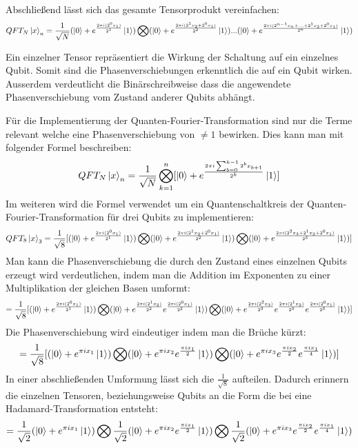 Abschließend lässt sich das gesamte Tensorprodukt vereinfachen:
\[QFT_{N}\ket{x}_{n} = \frac{1}{\sqrt{N}}(\ket{0} + { e^{\frac{2 \pi i (2^0x_1)}{2^1}}}\ket{1}) \bigotimes
( \ket{0} + { e^{\frac{2 \pi i (2^1x_2+2^0x_1)}{2^2}}}\ket{1})...
( \ket{0} + { e^{\frac{2 \pi i (2^{n-1}x_n+ ... +2^1x_2+2^0x_1)}{2^n}}}\ket{1})\]

Ein einzelner Tensor repräsentiert die Wirkung der Schaltung auf ein einzelnes Qubit.
Somit sind die Phasenverschiebungen erkenntlich die auf ein Qubit wirken.
Ausserdem verdeutlicht die Binärschreibweise dass die angewendete Phasenverschiebung vom Zustand anderer Qubits abhängt.

Für die Implementierung der Quanten-Fourier-Transformation sind nur die Terme relevant
welche eine Phasenverschiebung von \(\neq 1\) bewirken.
Dies kann man mit folgender Formel beschreiben:
\[QFT_{N}\ket{x}_{n} = \frac{1}{\sqrt{N}}\bigotimes_{k=1}^n [  \ket{0} + { e^{\frac{2 \pi i \sum_{b=0}^{k-1}2^b x_{b+1} }{2^k}}}\ket{1}]\] 
Im weiteren wird die Formel verwendet um ein Quantenschaltkreis der Quanten-Fourier-Transformation für drei Qubits zu implementieren:
\[QFT_{8}\ket{x}_{3} = \frac{1}{\sqrt{8}} [ (\ket{0} + { e^{\frac{2 \pi i (2^0x_1)}{2^1}}}\ket{1} ) \bigotimes
( \ket{0} + { e^{\frac{2 \pi i (2^1x_2+2^0x_1)}{2^2}}}\ket{1} ) \bigotimes
( \ket{0} + { e^{\frac{2 \pi i (2^{2}x_3 +2^1x_2+2^0x_1)}{2^3}}}\ket{1} ) ] \]
Man kann die Phasenverschiebung die durch den Zustand eines einzelnen Qubits erzeugt wird verdeutlichen,
indem man die Addition im Exponenten zu einer Multiplikation der gleichen Basen umformt:
\[ = \frac{1}{\sqrt{8}} [ (\ket{0} + { e^{\frac{2 \pi i (2^0x_1)}{2^1}}}\ket{1}) \bigotimes
( \ket{0} + { e^{\frac{2 \pi i (2^1x_2)}{2^2}} e^{\frac{2 \pi i (2^0x_1)}{2^2}} }\ket{1} ) \bigotimes
( \ket{0} + { e^{\frac{2 \pi i (2^{2}x_3)}{2^3}} e^{\frac{2 \pi i (2^1x_2)}{2^3}} e^{\frac{2 \pi i (2^0x_1)}{2^3}}  }\ket{1} ) ] \]
Die Phasenverschiebung wird eindeutiger indem man die Brüche kürzt:
\[ = \frac{1}{\sqrt{8}} [ ( \ket{0} + e^{\pi i x_1}\ket{1} ) \bigotimes
( \ket{0} + { e^{\pi i x_2} e^{ \frac{ \pi i x_1}{2}} }\ket{1} ) \bigotimes
( \ket{0} + { e^{\pi i x_3} e^{\frac{\pi i x_2}{2}} e^{ \frac{ \pi i x_1}{4}} }\ket{1} ) ] \]
In einer abschließenden Umformung lässt sich die \(\frac{1}{\sqrt8}\) aufteilen.
Dadurch erinnern die einzelnen Tensoren,
beziehungsweise Qubits an die Form die bei eine Hadamard-Transformation entsteht:
\[ = \frac{1}{\sqrt{2}}( \ket{0} + e^{\pi i x_1}\ket{1} ) \bigotimes
\frac{1}{\sqrt{2}}( \ket{0} + { e^{\pi i x_2} e^{ \frac{ \pi i x_1}{2}} }\ket{1} ) \bigotimes
\frac{1}{\sqrt{2}}( \ket{0} + { e^{\pi i x_3} e^{\frac{\pi i x_2}{2}} e^{ \frac{ \pi i x_1}{4}} }\ket{1} )  \]
